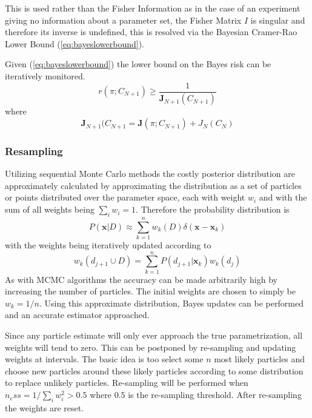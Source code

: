This is used rather than the Fisher Information as in the case of an experiment giving no information about a parameter set, the Fisher Matrix $I$ is singular and therefore its inverse is undefined, this is resolved via the Bayesian Cramer-Rao Lower Bound (\ref{eq:bayeslowerbound}). 

Given (\ref{eq:bayeslowerbound}) the lower bound on the Bayes risk can be iteratively monitored. 
\begin{equation}
r(\pi;C_{N+1})\geq \frac{1}{\mathbf{J}_{N+1}(C_{N+1})}
\end{equation}
where 
\begin{equation}
\mathbf{J}_{N+1}(C_{N+1} = \mathbf{J}(\pi;C_{N+1})+ J_N(C_N)
\label{eq:riskiteration}
\end{equation}
\subsubsection{Resampling}
\label{sec:resampling}
Utilizing sequential Monte Carlo methods the costly posterior distribution are approximately calculated by approximating the distribution as a set of particles or points distributed over the parameter space, each with weight $w_i$ and with the sum of all weights being $\sum \limits_i w_i = 1$. Therefore the probability distribution is 
\begin{equation*}
P(\mathbf{x}|D) \approx \sum \limits_{k=1}^n w_k(D)\delta(\mathbf{x}-\mathbf{x}_k)
\end{equation*}
with the weights being iteratively updated according to 
\begin{equation*}
w_k(d_{j+1} \cup D) = \sum \limits_{k=1}^n P(d_{j+1}|\mathbf{x}_k)w_k(d_j)
\end{equation*}
As with MCMC algorithms the accuracy can be made arbitrarily high by increasing the number of particles. The initial weights are chosen to simply be $w_k = 1/n$. Using this approximate distribution, Bayes updates can be performed and an accurate estimator approached.

Since any particle estimate will only ever approach the true parametrization, all weights will tend to zero. This can be postponed by re-sampling and updating weights at intervals. The basic idea is too select some $n$ most likely particles and choose new particles around these likely particles according to some distribution to replace unlikely particles. Re-sampling will be performed when $n_ess = 1/\sum \limits_i w_i^2>0.5$ where $0.5$ is the re-sampling threshold. After re-sampling the weights are reset. 

